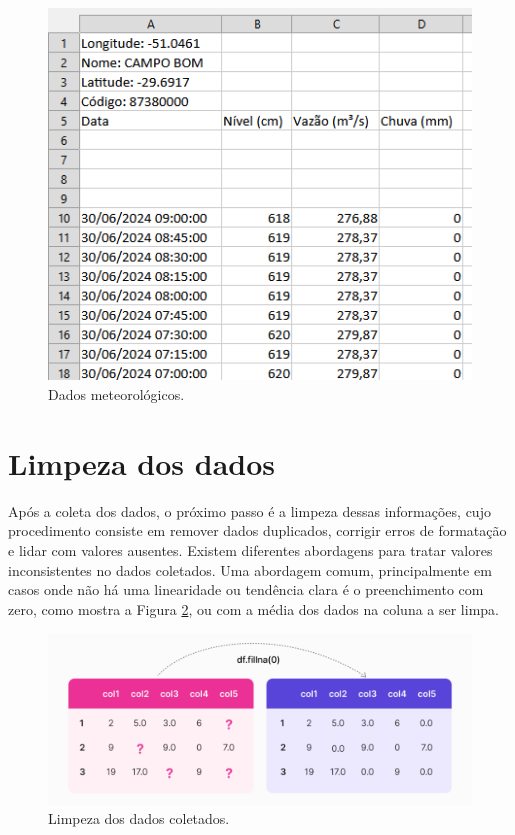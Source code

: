 \begin{figure}[H]
	\caption{\label{fig:base_sema}Dados meteorológicos.}
	\begin{center}
		\includegraphics[scale=0.5]{figuras/base_sema.png}
	\end{center}
\end{figure}

\section{Limpeza dos dados}

Após a coleta dos dados, o próximo passo é a limpeza dessas informações, cujo procedimento consiste em remover dados duplicados, corrigir erros de formatação e lidar com valores ausentes. Existem diferentes abordagens para tratar valores inconsistentes no dados coletados. Uma abordagem comum, principalmente em casos onde não há uma linearidade ou tendência clara é o preenchimento com zero, como mostra a Figura \ref{fig:passo_dados_limpeza}, ou com a média dos dados na coluna a ser limpa.

\begin{figure}[H]
	\caption{\label{fig:passo_dados_limpeza}Limpeza dos dados coletados.}
	\begin{center}
		\includegraphics[scale=0.4]{figuras/step_data_cleaning.png}
	\end{center}
\end{figure}

